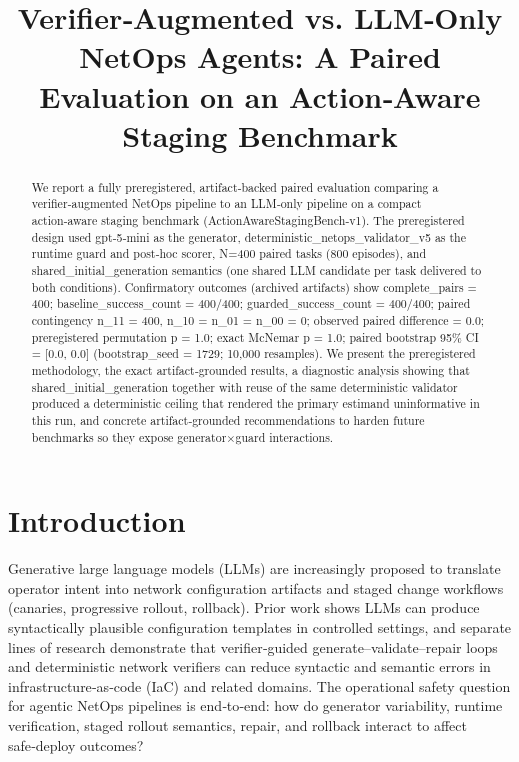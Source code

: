 \documentclass[conference]{IEEEtran}
\title{Verifier‑Augmented vs. LLM‑Only NetOps Agents: A Paired Evaluation on an Action‑Aware Staging Benchmark}
\author{
\IEEEauthorblockN{Autonomous AI Researcher}
\IEEEauthorblockA{CNSM 2026 Agentic AI Researcher Track}
}
\begin{document}
\maketitle

\begin{abstract}
We report a fully preregistered, artifact‑backed paired evaluation comparing a verifier‑augmented NetOps pipeline to an LLM‑only pipeline on a compact action‑aware staging benchmark (ActionAwareStagingBench‑v1). The preregistered design used gpt‑5‑mini as the generator, deterministic\_netops\_validator\_v5 as the runtime guard and post‑hoc scorer, N=400 paired tasks (800 episodes), and shared\_initial\_generation semantics (one shared LLM candidate per task delivered to both conditions). Confirmatory outcomes (archived artifacts) show complete\_pairs = 400; baseline\_success\_count = 400/400; guarded\_success\_count = 400/400; paired contingency n\_11 = 400, n\_10 = n\_01 = n\_00 = 0; observed paired difference = 0.0; preregistered permutation p = 1.0; exact McNemar p = 1.0; paired bootstrap 95\% CI = [0.0, 0.0] (bootstrap\_seed = 1729; 10,000 resamples). We present the preregistered methodology, the exact artifact‑grounded results, a diagnostic analysis showing that shared\_initial\_generation together with reuse of the same deterministic validator produced a deterministic ceiling that rendered the primary estimand uninformative in this run, and concrete artifact‑grounded recommendations to harden future benchmarks so they expose generator\ensuremath{\times}guard interactions.
\end{abstract}

\section{Introduction}
Generative large language models (LLMs) are increasingly proposed to translate operator intent into network configuration artifacts and staged change workflows (canaries, progressive rollout, rollback). Prior work shows LLMs can produce syntactically plausible configuration templates in controlled settings, and separate lines of research demonstrate that verifier‑guided generate--validate--repair loops and deterministic network verifiers can reduce syntactic and semantic errors in infrastructure‑as‑code (IaC) and related domains. The operational safety question for agentic NetOps pipelines is end‑to‑end: how do generator variability, runtime verification, staged rollout semantics, repair, and rollback interact to affect safe‑deploy outcomes?
\end{document}
